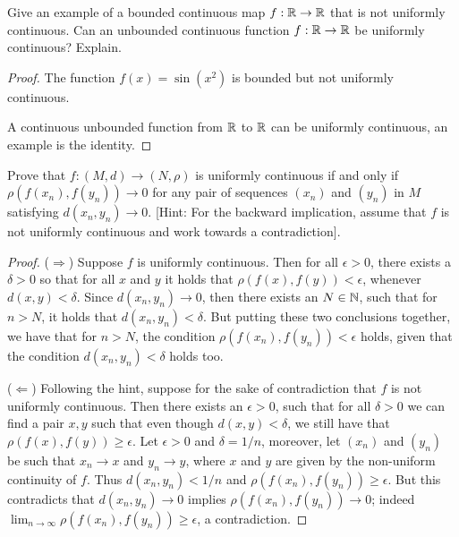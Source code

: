 \begin{exercise}{55}
Give an example of a bounded continuous map $f:\mathbb{R}\to\mathbb{R}$ that is not uniformly continuous.
Can an unbounded continuous function $f:\mathbb{R}\to\mathbb{R}$ be uniformly continuous?
Explain.
\end{exercise}
\begin{proof}
The function $f(x)=\sin(x^2)$ is bounded but not uniformly continuous.

A continuous unbounded function from $\mathbb{R}$ to $\mathbb{R}$ can be uniformly continuous, an example is the identity.
\end{proof} 

\begin{exercise}{56}
Prove that $f:(M,d)\to(N,\rho)$ is uniformly continuous if and only if $\rho(f(x_n),f(y_n))\to 0$ for any pair of sequences $(x_n)$ and $(y_n)$ in $M$ satisfying $d(x_n,y_n)\to 0$.
[Hint: For the backward implication, assume that $f$ is not uniformly continuous and work towards a contradiction].
\end{exercise}
\begin{proof}
($\Rightarrow$)
Suppose $f$ is uniformly continuous.
Then for all $\epsilon>0$, there exists a $\delta>0$ so that for all $x$ and $y$ it holds that $\rho(f(x),f(y))<\epsilon$, whenever $d(x,y)<\delta$.
Since $d(x_n,y_n) \to 0$, then there exists an $N\in\mathbb{N}$, such that for $n>N$, it holds that $d(x_n,y_n)<\delta$.
But putting these two conclusions together, we have that for $n>N$, the condition $\rho(f(x_n),f(y_n))<\epsilon$ holds, given that the condition $d(x_n,y_n)<\delta$ holds too.

($\Leftarrow$)
Following the hint, suppose for the sake of contradiction that $f$ is not uniformly continuous.
Then there exists an $\epsilon>0$, such that for all $\delta>0$ we can find a pair $x,y$ such that even though $d(x,y)<\delta$, we still have that $\rho(f(x),f(y))\geq\epsilon$.
Let $\epsilon>0$ and $\delta=1/n$, moreover, let $(x_n)$ and $(y_n)$ be such that $x_n\to x$ and $y_n\to y$, where $x$ and $y$ are given by the non-uniform continuity of $f$.
Thus $d(x_n,y_n)<1/n$ and $\rho(f(x_n), f(y_n))\geq \epsilon$.
But this contradicts that $d(x_n,y_n)\to 0$ implies $\rho(f(x_n),f(y_n))\to 0$;
indeed $\lim_{n\to\infty}\rho(f(x_n),f(y_n)) \geq \epsilon$, a contradiction.
\end{proof} 

